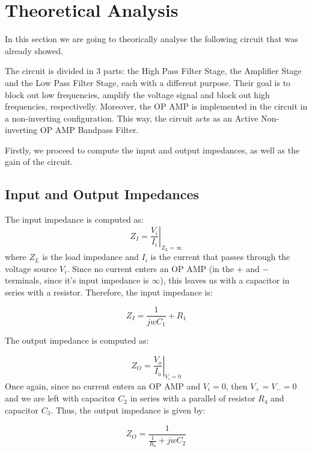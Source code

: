 \section{Theoretical Analysis}
\label{sec:analysis}

In this section we are going to theorically analyse the following circuit that was already showed.

The circuit is divided in 3 parts: the High Pass Filter Stage, the Amplifier Stage and the Low Pass Filter Stage, each with a different purpose. Their goal is to block out low frequencies, amplify the voltage signal and block out high frequencies, respectivelly.
Moreover, the OP AMP is implemented in the circuit in a non-inverting configuration. This way, the circuit acts as an Active Non-inverting OP AMP Bandpass Filter.\par
Firstly, we proceed to compute the input and output impedances, as well as the gain of the circuit.

\subsection{Input and Output Impedances}

The input impedance is computed as:
\begin{equation}
    Z_{I}=\left.\frac{V_{i}}{I_{i}}\right\vert_{Z_L=\infty}
\end{equation}
where $Z_{L}$ is the load impedance and $I_i$ is the current that passes through the voltage source $V_i$. Since no current enters an OP AMP (in the $+$ and $-$ terminals, since it's input impedance is $\infty$), this leaves us with a capacitor in series with a resistor.
Therefore, the input impedance is:

\begin{equation}
    Z_{I}=\frac{1}{jwC_1}+R_1
\end{equation}

The output impedance is computed as:

\begin{equation}
    Z_{O}=\left.\frac{V_{o}}{I_{o}}\right\vert_{V_i=0}
\end{equation}
Once again, since no current enters an OP AMP and $V_i=0$, then $V_{+}=V_{-}=0$  and we are left with capacitor $C_2$ in series with a parallel of resistor $R_4$ and capacitor $C_3$.
Thus, the output impedance is given by:

\begin{equation}
    Z_{O}=\frac{1}{\frac{1}{R_4}+jwC_2}
\end{equation}



